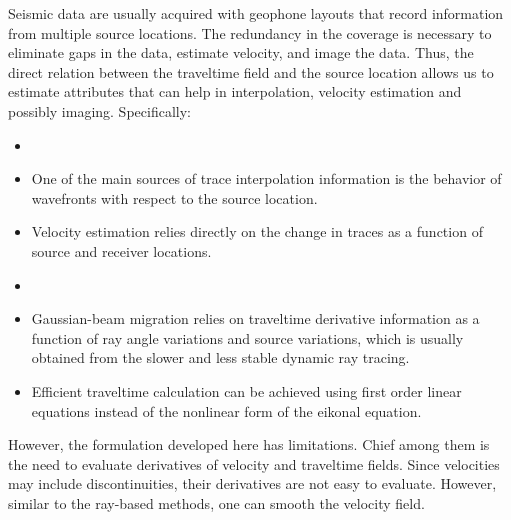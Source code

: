 Seismic data are usually acquired with geophone layouts that record
information from multiple source locations. The redundancy in the
coverage is necessary to eliminate gaps in the data, estimate
velocity, and image the data. Thus, the direct relation between the
traveltime field and the source location allows us to estimate
attributes that can help in interpolation, velocity estimation and
possibly imaging. Specifically:
 \begin{itemize}
   \item {}


 \item One of the main sources of trace interpolation information is
   the behavior of wavefronts with respect to the source location.
 \item Velocity estimation relies directly on the change in traces as
   a function of source and receiver locations.

   \item {}

 \item Gaussian-beam migration
   \cite[]{GEO55-11-14161428,GEO66-04-12401250,GEO60-05-14741484,GEO70-04-S71S77}
   relies on traveltime derivative information as a function of ray
   angle variations and source variations, which is usually obtained
   from the slower and less stable dynamic ray tracing.
 \item Efficient traveltime calculation can be achieved using first
   order linear equations instead of the nonlinear form of the eikonal
   equation.

 \end{itemize}

 However, the formulation developed here has limitations. Chief among
 them is the need to evaluate derivatives of velocity and traveltime
 fields.  Since velocities may include discontinuities, their
 derivatives are not easy to evaluate. However, similar to the
 ray-based methods, one can  smooth the velocity field.

